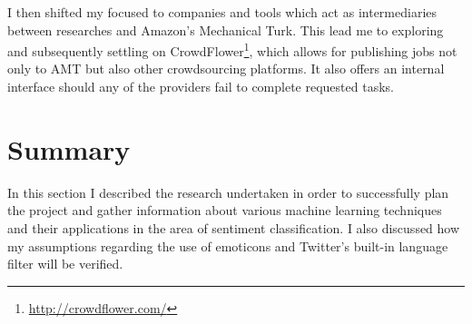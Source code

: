 I then shifted my focused to companies and tools which act as intermediaries between researches and Amazon's Mechanical Turk. This lead me to exploring and subsequently settling on CrowdFlower\footnote{\url{http://crowdflower.com/}}, which allows for publishing jobs not only to AMT but also other crowdsourcing platforms. It also offers an internal interface should any of the providers fail to complete requested tasks.

\section{Summary}

In this section I described the research undertaken in order to successfully plan the project and gather information about various machine learning techniques and their applications in the area of sentiment classification. I also discussed how my assumptions regarding the use of emoticons and Twitter's built-in language filter will be verified.